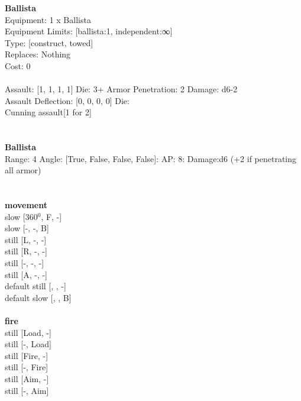 \noindent 

{\bf Ballista } \\
Equipment: 1 x Ballista \\
Equipment Limits: [ballista:1, independent:∞] \\
Type: [construct, towed] \\
Replaces: Nothing \\
Cost: 0\\
\ \\
Assault: [1, 1, 1, 1] Die: 3+ Armor Penetration: 2 Damage: d6-2 \\
Assault Deflection: [0, 0, 0, 0] Die: \\
\indent Cunning assault[1 for 2]\\ 
 
\ \\

\ \\
{\bf Ballista } \\



Range: 4  Angle: [True, False, False, False]: AP: 8: Damage:d6 (+2 if penetrating all armor) \\




 
\ \\



\ \\ {\bf movement } \\
slow [360$^0$, F, -] \\
slow [-, -, B] \\
still [L, -, -] \\
still [R, -, -] \\
still [-, -, -] \\
still [A, -, -] \\
default still [, , -] \\
default slow [, , B] \\
\ \\ {\bf fire } \\
still [Load, -] \\
still [-, Load] \\
still [Fire, -] \\
still [-, Fire] \\
still [Aim, -] \\
still [-, Aim] \\


